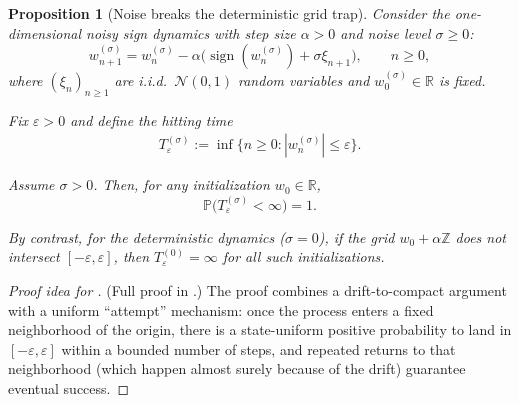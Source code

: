 \documentclass[10pt,a4paper]{amsart}
\newtheorem{proposition}{Proposition}
\newcommand{\PP}{\mathbb{P}}
\newcommand{\R}{\mathbb{R}}
\newcommand{\Z}{\mathbb{Z}}
\newcommand{\eps}{\varepsilon}
\newcommand{\sign}{\operatorname{sign}}
\newcommand{\stepsize}{\alpha}
\begin{document}
\begin{proposition}[Noise breaks the deterministic grid trap]
\label{prop:noise-breaks-grid}
Consider the one-dimensional noisy sign dynamics with step size $\stepsize>0$
and noise level $\sigma\ge 0$:
\[
  w_{n+1}^{(\sigma)}
  = w_n^{(\sigma)} - \stepsize\bigl(\sign(w_n^{(\sigma)}) + \sigma \xi_{n+1}\bigr),
  \qquad n \ge 0,
\]
where $(\xi_n)_{n\ge1}$ are i.i.d.\ $\mathcal{N}(0,1)$ random variables and $w_0^{(\sigma)}\in\R$ is fixed. 

Fix $\eps>0$ and define the hitting time
\begin{align}
  T_\eps^{(\sigma)} := \inf\{n \ge 0 : |w_n^{(\sigma)}| \le \eps\}.
  \label{eq:hittingtimefoo}
\end{align}

Assume $\sigma>0$. 
Then, for any initialization $w_0\in\R$,
\[
  \PP\bigl(T_\eps^{(\sigma)} < \infty\bigr) = 1.
\]

By contrast, for the deterministic dynamics ($\sigma = 0$), if the grid
$w_0 + \stepsize\Z$ does not intersect $[-\eps,\eps]$, then
$T_\eps^{(0)} = \infty$ for all such initializations.
\end{proposition}

\begin{proof}[Proof idea for ]
  (Full proof in .)
The proof combines a drift-to-compact argument
with a uniform ``attempt'' mechanism:
once the process enters a fixed neighborhood of the origin, 
there is a state-uniform positive probability to land in $[-\eps,\eps]$ 
within a bounded number of steps, 
and repeated returns to that neighborhood 
(which happen almost surely because of the drift)
guarantee eventual success.
\end{proof}
\end{document}
